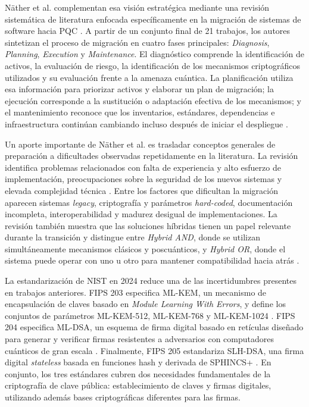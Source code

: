 Näther et al. complementan esa visión estratégica mediante una revisión sistemática de literatura enfocada específicamente en la migración de sistemas de software hacia PQC \cite{naether2024migrating}. A partir de un conjunto final de 21 trabajos, los autores sintetizan el proceso de migración en cuatro fases principales: \textit{Diagnosis}, \textit{Planning}, \textit{Execution} y \textit{Maintenance}. El diagnóstico comprende la identificación de activos, la evaluación de riesgo, la identificación de los mecanismos criptográficos utilizados y su evaluación frente a la amenaza cuántica. La planificación utiliza esa información para priorizar activos y elaborar un plan de migración; la ejecución corresponde a la sustitución o adaptación efectiva de los mecanismos; y el mantenimiento reconoce que los inventarios, estándares, dependencias e infraestructura continúan cambiando incluso después de iniciar el despliegue \cite{naether2024migrating}.

Un aporte importante de Näther et al. es trasladar conceptos generales de preparación a dificultades observadas repetidamente en la literatura. La revisión identifica problemas relacionados con falta de experiencia y alto esfuerzo de implementación, preocupaciones sobre la seguridad de los nuevos sistemas y elevada complejidad técnica \cite{naether2024migrating}. Entre los factores que dificultan la migración aparecen sistemas \textit{legacy}, criptografía y parámetros \textit{hard-coded}, documentación incompleta, interoperabilidad y madurez desigual de implementaciones. La revisión también muestra que las soluciones híbridas tienen un papel relevante durante la transición y distingue entre \textit{Hybrid AND}, donde se utilizan simultáneamente mecanismos clásicos y poscuánticos, y \textit{Hybrid OR}, donde el sistema puede operar con uno u otro para mantener compatibilidad hacia atrás \cite{naether2024migrating}.

La estandarización de NIST en 2024 reduce una de las incertidumbres presentes en trabajos anteriores. FIPS 203 especifica ML-KEM, un mecanismo de encapsulación de claves basado en \textit{Module Learning With Errors}, y define los conjuntos de parámetros ML-KEM-512, ML-KEM-768 y ML-KEM-1024 \cite{nist2024fips203}. FIPS 204 especifica ML-DSA, un esquema de firma digital basado en retículas diseñado para generar y verificar firmas resistentes a adversarios con computadores cuánticos de gran escala \cite{nist2024fips204}. Finalmente, FIPS 205 estandariza SLH-DSA, una firma digital \textit{stateless} basada en funciones hash y derivada de SPHINCS+ \cite{nist2024fips205}. En conjunto, los tres estándares cubren dos necesidades fundamentales de la criptografía de clave pública: establecimiento de claves y firmas digitales, utilizando además bases criptográficas diferentes para las firmas.

